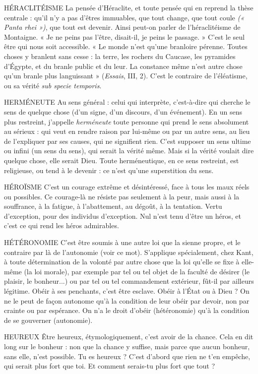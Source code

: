 HÉRACLITÉISME La pensée d'Héraclite, et toute pensée qui en reprend la
thèse centrale : qu’il n’y a pas d'êtres immuables, que
tout change, que tout coule {\it (« Panta rhei »)}, que tout est devenir. Ainsi peut-on
parler de l’héraclitéisme de Montaigne. « Je ne peins pas l'être, disait-il, je
peins le passage. » C’est le seul être qui nous soit accessible. « Le monde n’est
qu'une branloire pérenne. Toutes choses y branlent sans cesse : la terre, les
rochers du Caucase, les pyramides d'Égypte, et du branle public et du leur. La
constance même n'est autre chose qu’un branle plus languissant » ({\it Essais}, III,
2). C’est le contraire de l’éléatisme, ou sa vérité {\it sub specie temporis}.

HERMÉNEUTE Au sens général : celui qui interprète, c’est-à-dire qui
cherche le sens de quelque chose (d’un signe, d’un discours,
d’un événement). En un sens plus restreint, j’appelle {\it herméneute} toute
personne qui prend le sens absolument au sérieux : qui veut en rendre raison
par lui-même ou par un autre sens, au lieu de l’expliquer par ses causes, qui ne
signifient rien. C’est supposer un sens ultime ou infini (un sens du sens), qui
serait la vérité même. Mais si la vérité voulait dire quelque chose, elle serait
Dieu. Toute herméneutique, en ce sens restreint, est religieuse, ou tend à le
devenir : ce n’est qu’une superstition du sens.

HÉROÏSME C’est un courage extrême et désintéressé, face à tous les maux
réels ou possibles.
Ce courage-là ne résiste pas seulement à la peur, mais aussi à la souffrance,
à la fatigue, à l'abattement, au dégoût, à la tentation. Vertu d’exception, pour
des individus d’exception. Nul n’est tenu d’être un héros, et c’est ce qui rend
les héros admirables.

HÉTÉRONOMIE C’est être soumis à une autre loi que la sienne propre, et
le contraire par là de l’autonomie (voir ce mot). S’applique
spécialement, chez Kant, à toute détermination de la volonté par autre
chose que la loi qu’elle se fixe à elle-même (la loi morale), par exemple par tel
ou tel objet de la faculté de désirer (le plaisir, le bonheur...) ou par tel ou tel
commandement extérieur, fût-il par ailleurs légitime. Obéir à ses penchants,
c’est être esclave. Obéir à l’État ou à Dieu ? On ne le peut de façon autonome
qu’à la condition de leur obéir par devoir, non par crainte ou par espérance. On
n'a le droit d’obéir (hétéronomie) qu’à la condition de se gouverner (autonomie).

HEUREUX Être heureux, étymologiquement, c’est avoir de la chance. Cela
en dit long sur le bonheur : non que la chance y suffise, mais
parce que aucun bonheur, sans elle, n’est possible. Tu es heureux ? C’est
d’abord que rien ne t’en empêche, qui serait plus fort que toi. Et comment
serais-tu plus fort que tout ?

